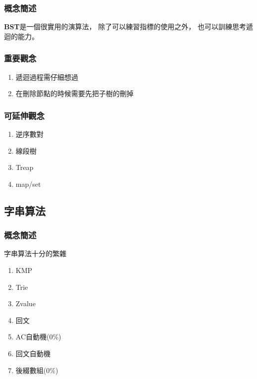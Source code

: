 \documentclass[12pt,oneside]{article}
\begin{document}
\subsubsection*{概念簡述}

\textbf{BST}是一個很實用的演算法，
除了可以練習指標的使用之外，
也可以訓練思考遞迴的能力。


\subsubsection*{重要觀念}
\begin{adjustwidth}{2em}{0em}
\begin{enumerate}
    \item 遞迴過程需仔細想過
    \item 在刪除節點的時候需要先把子樹的刪掉
\end{enumerate}
\end{adjustwidth}

\subsubsection*{可延伸觀念}
\begin{adjustwidth}{2em}{0em}
\begin{enumerate}
    \item 逆序數對
    \item 線段樹
    \item Treap
    \item map/set
\end{enumerate}
\end{adjustwidth}
\clearpage


\subsection{字串算法}
\subsubsection*{概念簡述}
字串算法十分的繁雜
\begin{adjustwidth}{2em}{0em}
\begin{enumerate}
    \item KMP 
    \item Trie 
    \item Zvalue 
    \item 回文
    \item AC自動機(0\%)
    \item 回文自動機
    \item 後綴數組(0\%)
\end{enumerate}
\end{adjustwidth}
\clearpage
\end{document}
